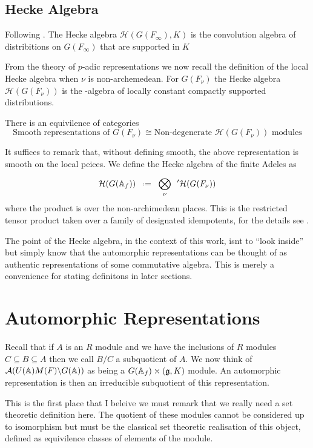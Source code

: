 \subsection{Hecke Algebra}
Following \cite[I.II]{borelAutomorphicFormsRepresentations1979}. The Hecke algebra \(\mathcal{H}(G(F_\infty), K)\) is the convolution algebra of distribitions on \(G(F_\infty)\) that are supported in \(K\)

\begin{Theorem}
\end{Theorem}

From the theory of \(p\)-adic representations we now recall the definition of the local Hecke algebra when \(\nu\) is non-archemedean. For \(G(F_\nu)\) the Hecke algebra \(\mathcal{H}(G(F_\nu))\) is the \C-algebra of locally constant compactly supported distributions. 
\begin{theorem}
    There is an equivilence of categories  
    \[\text{Smooth representations of }G(F_\nu) \cong \text{Non-degenerate }\mathcal{H}(G(F_\nu)) \text{ modules}\]
\end{theorem}
It suffices to remark that, without defining smooth, the above representation is smooth on the local peices. We define the Hecke algebra of the finite Adeles as 
\[\mathcal{H}(G(\A_f)) \defeq \bigotimes^{}_\nu \phantom{a}' \mathcal{H}(G(F_\nu))\]
where the product is over the non-archimedean places. This is the restricted tensor product taken over a family of designated idempotents, for the details see
.

The point of the Hecke algebra, in the context of this work, isnt to ``look inside'' but simply know that the automorphic representations can be thought of as authentic representations of some commutative algebra. This is merely a convenience for stating definitons in later sections.

\section{Automorphic Representations}
Recall that if \(A\) is an \(R\) module and we have the inclusions of \(R\) modules \(C \subseteq B \subseteq A\) then we call \(B/C\) a subquotient of \(A\). We now think of \(\mathcal{A}(U(\A)M(F)\backslash G(\A))\) as being a \(G(\A_f)\times (\mathfrak{g}, K)\) module. An automorphic representation is then an irreducible subquotient of this representation.
\begin{remark}
    This is the first place that I beleive we must remark that we really need a set theoretic definition here. The quotient of these modules cannot be considered up to isomorphism but must be the classical set theoretic realisation of this object, defined as equivilence classes of elements of the module.
\end{remark}

